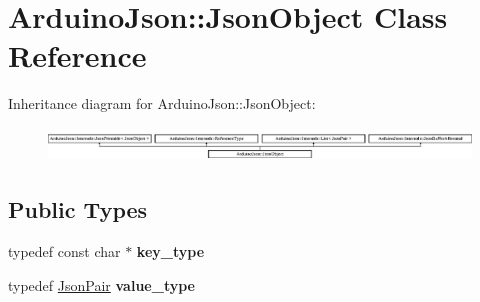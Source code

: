 \hypertarget{class_arduino_json_1_1_json_object}{}\section{Arduino\+Json\+:\+:Json\+Object Class Reference}
\label{class_arduino_json_1_1_json_object}
Inheritance diagram for Arduino\+Json\+:\+:Json\+Object\+:\begin{figure}[H]
\begin{center}
\leavevmode
\includegraphics[height=0.883281cm]{class_arduino_json_1_1_json_object}
\end{center}
\end{figure}
\subsection*{Public Types}
\begin{DoxyCompactItemize}
\item 
\hypertarget{class_arduino_json_1_1_json_object_a848d74f26763c6de0cff7a74916caf3b}{}typedef const char $\ast$ {\bfseries key\+\_\+type}\label{class_arduino_json_1_1_json_object_a848d74f26763c6de0cff7a74916caf3b}

\item 
\hypertarget{class_arduino_json_1_1_json_object_ac999e99e637548a25aceef530b0a2e3b}{}typedef \hyperlink{struct_arduino_json_1_1_json_pair}{Json\+Pair} {\bfseries value\+\_\+type}\label{class_arduino_json_1_1_json_object_ac999e99e637548a25aceef530b0a2e3b}

\end{DoxyCompactItemize}
